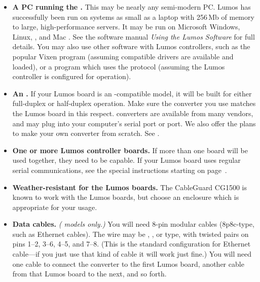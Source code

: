 \documentclass[letterpaper,twoside,onecolumn,openright,final]{memoir}
\begin{document}
\begin{itemize}
	\item	{\bfseries A PC running the .}
		This may be nearly any semi-modern PC.  Lumos has successfully been run on systems as small as 
		a laptop with 256\,Mb of memory to large, high-performance servers.  It may be run on Microsoft
		Windows, Linux, , and Mac .  See the software manual \emph{Using the Lumos Software} 
		for full details.  You may also use other software with Lumos controllers, such as the popular
		Vixen program (assuming compatible drivers are available and loaded), or a program which uses the
		 protocol (assuming the Lumos controller is configured for  operation).
		
	\item	{\bfseries An .}
		If your Lumos board is an -compatible model, it will be built for either full-duplex or half-duplex
		operation.  Make sure the  converter you use matches the Lumos board in this respect.  
		converters are available from many vendors, and may plug into your computer's serial port or 
		port.  We also offer the plans to make your own  converter from scratch.
		See .

	\item	{\bfseries One or more Lumos controller boards.}  If more than one board will be used together,
		they need to be  capable.  If your Lumos board uses regular  serial communications,
		see the special instructions starting on page~\pageref{sec:rs232}.

	\item	{\bfseries Weather-resistant  for the Lumos boards.}  The Cable\-Guard\textsuperscript{\textregistered}
		CG1500 
		is known to work with the Lumos boards, but choose an enclosure which is appropriate for your usage.

	\item	{\bfseries Data cables.}  \emph{( models only.)}
		You will need 8-pin modular cables (8p8c-type, such as Ethernet cables).  The 
		wire may be , , or  type, 
		with twisted pairs on pins 1--2, 3--6, 4--5, and 7--8.
		(This is the standard configuration for Ethernet cable---if you just use that kind of cable
		it will work just fine.)  You will need one cable to connect the  converter to the
		first Lumos board, another cable from that Lumos board to the next, and so forth.  


\end{itemize}
\end{document}
